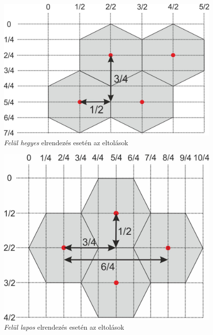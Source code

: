\begin{figure}[h!]
\centering
\includegraphics[scale=1.0]{kepek/PointyTop.jpg}
\caption{\textit{Felül hegyes} elrendezés esetén az eltolások}
\label{fig:PointyTop}
\end{figure}

\begin{figure}[h!]
\centering
\includegraphics[scale=1.0]{kepek/FlatTop.jpg}
\caption{\textit{Felül lapos} elrendezés esetén az eltolások}
\label{fig:FlatTop}
\end{figure}
